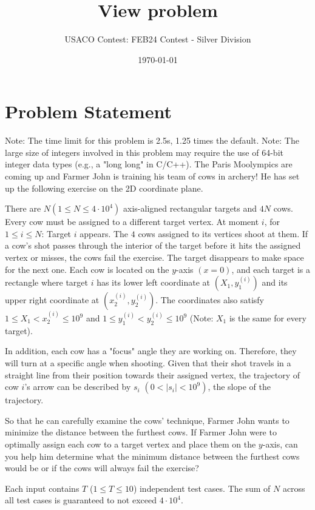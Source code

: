 \documentclass[12pt]{article}
\title{View problem}
\author{USACO Contest: FEB24 Contest - Silver Division}
\date{\today}
\begin{document}
\maketitle

\section*{Problem Statement}


Note: The time limit for this problem is 2.5s, 1.25 times the default.
Note: The large size of integers involved in this problem may require the use
of 64-bit integer data types (e.g., a "long long" in C/C++).
The Paris Moolympics are coming up and Farmer John is training his team of cows
in archery! He has set up the following exercise on the 2D coordinate plane.

There are $N (1 \leq N \leq 4 \cdot 10^4)$ axis-aligned rectangular targets and
$4N$ cows. Every cow must be assigned to a different target vertex. At moment
$i$, for
$1 \leq i \leq N$:
 Target $i$ appears. The $4$ cows assigned to its vertices shoot
at them. If a cow's shot passes through the interior of the target
before it hits the assigned vertex or misses, the cows fail the
exercise. The target disappears to make space for the next one.
Each cow is located on the $y$-axis $(x = 0)$, and each target is a rectangle
where target $i$ has its lower left coordinate at $(X_1, y_1^{(i)})$ and its
upper right coordinate at $(x_2^{(i)}, y_2^{(i)})$. The coordinates also satisfy
$1 \leq X_1 < x_2^{(i)}\leq 10^9$ and $1 \leq y_1^{(i)} <  y_2^{(i)} \leq 10^9$
(Note: $X_1$ is the same for every target).

In addition, each cow has a "focus" angle they are working on. Therefore, they
will turn at a specific angle when shooting. Given that their shot travels in a
straight line from their position towards their assigned vertex, the trajectory
of cow $i$'s arrow can be described by $s_i$ $(0 < |s_i| < 10^9)$, the slope of
the trajectory.

So that he can carefully examine the cows' technique, Farmer John wants to
minimize the distance between the furthest cows. If Farmer John were to
optimally assign each cow to a target vertex and place them on the $y$-axis, can
you help him determine what the minimum distance between the furthest cows would
be or if the cows will always fail the exercise?

Each input contains $T$ ($1 \leq T \leq 10$) independent test cases. The sum of
$N$ across all test cases is guaranteed to not exceed $4\cdot 10^4$.
\end{document}
